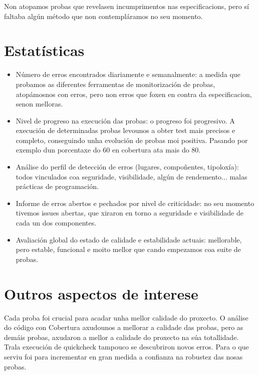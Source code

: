 \documentclass[DIV=calc,paper=a4,fontsize=11pt,onecolumn]{scrartcl}	 %
\begin{document}
Non atopamos probas que revelasen incumprimentos nas especificacions, pero sí faltaba algún método que non contempláramos no seu momento.\\

\section{Estatísticas}


  \begin{itemize}
    \item Número de erros encontrados diariamente e semanalmente: a medida que probamos as diferentes ferramentas de monitorización de probas, atopámosnos con erros, pero non erros que foxen en contra da especificacion, senon melloras. \\
    \item Nivel de progreso na execución das probas: o progreso foi progresivo. A execución de determinadas probas levounos a obter test mais precisos e completo, conseguindo unha evolución de probas moi positiva. Pasando por exemplo dun porcentaxe do 60 en cobertura ata mais do 80.  \\
    \item Análise do perfil de detección de erros (lugares, compoñentes, tipoloxía): todos vinculados coa seguridade, visibilidade, algún de rendemento... malas prácticas de programación.\\
    \item Informe de erros abertos e pechados por nivel de criticidade: no seu momento tivemos issues abertas, que xiraron en torno a seguridade e visibilidade de cada un dos componentes. \\
    \item Avaliación global do estado de calidade e estabilidade actuais: mellorable, pero estable, funcional e moito mellor que cando empezamos coa suite de probas. \\
  \end{itemize}

\section{Outros aspectos de interese}

Cada proba foi crucial para acadar unha mellor calidade do proxecto. O análise do código con Cobertura axudounos a mellorar a calidade das probas, pero as demáis probas, axudaron a mellor a calidade do proxecto na súa totallidade. \\

Trala execución de quickcheck tampouco se descubriron novos erros. Para o que serviu foi para incrementar en gran medida a confianza na robustez das nosas probas.
\end{document}
